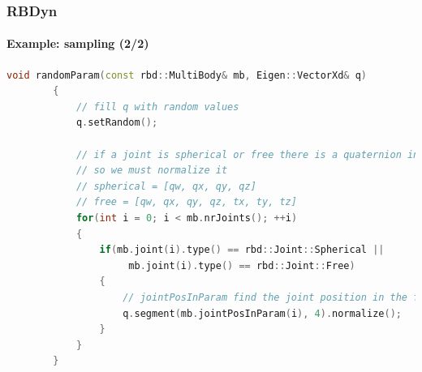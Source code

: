 \documentclass{beamer}
\begin{document}
\begin{frame}[fragile]
	\frametitle{RBDyn}
	\framesubtitle{Example: sampling (2/2)}
	\begin{lstlisting}[language=C++,basicstyle=\tiny]
		void randomParam(const rbd::MultiBody& mb, Eigen::VectorXd& q)
		{
			// fill q with random values
			q.setRandom();

			// if a joint is spherical or free there is a quaternion inside
			// so we must normalize it
			// spherical = [qw, qx, qy, qz]
			// free = [qw, qx, qy, qz, tx, ty, tz]
			for(int i = 0; i < mb.nrJoints(); ++i)
			{
				if(mb.joint(i).type() == rbd::Joint::Spherical ||
					 mb.joint(i).type() == rbd::Joint::Free)
				{
					// jointPosInParam find the joint position in the flat q vector
					q.segment(mb.jointPosInParam(i), 4).normalize();
				}
			}
		}
	\end{lstlisting}
\end{frame}
\end{document}
